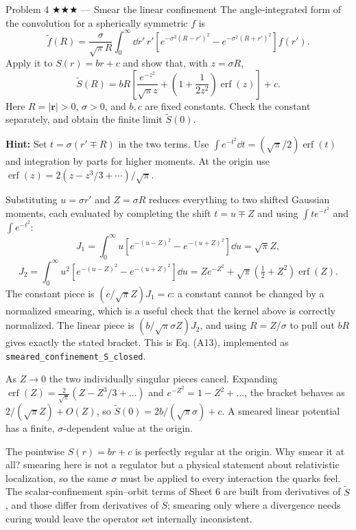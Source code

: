 \documentclass[11pt]{article}
\begin{document}
\begin{problem}{Problem 4 ★★★ — Smear the linear confinement}
The angle-integrated form of the convolution for a spherically symmetric $f$ is
\[
\widetilde f(R)=\frac{\sigma}{\sqrt\pi R}\int_0^\infty\dd r'\,r'
\left[e^{-\sigma^2(R-r')^2}-e^{-\sigma^2(R+r')^2}\right]f(r').
\]
Apply it to $S(r)=br+c$ and show that, with $z=\sigma R$,
\[
\widetilde S(R)=bR\left[\frac{e^{-z^2}}{\sqrt\pi z}
+\left(1+\frac1{2z^2}\right)\operatorname{erf}(z)\right]+c .
\]
Here $R=|\bm r|>0$, $\sigma>0$, and $b,c$ are fixed constants.
Check the constant separately, and obtain the finite limit $\widetilde S(0)$.

\textbf{Hint:} Set $t=\sigma(r'\mp R)$ in the two terms. Use
$\int e^{-t^2}\dd t=(\sqrt\pi/2)\operatorname{erf}(t)$ and integration
by parts for higher moments. At the origin use
$\operatorname{erf}(z)=2(z-z^3/3+\cdots)/\sqrt\pi$.
\end{problem}
\begin{solution}
Substituting $u=\sigma r'$ and $Z=\sigma R$ reduces everything to two shifted
Gaussian moments, each evaluated by completing the shift $t=u\mp Z$ and using
$\int t e^{-t^2}$ and $\int e^{-t^2}$:
\[
J_1=\int_0^\infty\! u\left[e^{-(u-Z)^2}-e^{-(u+Z)^2}\right]\dd u=\sqrt\pi Z,
\]
\[
J_2=\int_0^\infty\! u^2\left[e^{-(u-Z)^2}-e^{-(u+Z)^2}\right]\dd u
=Ze^{-Z^2}+\sqrt\pi\left(\tfrac12+Z^2\right)\operatorname{erf}(Z).
\]
The constant piece is $(c/\sqrt\pi Z)J_1=c$: a constant cannot be changed by a
normalized smearing, which is a useful check that the kernel above is correctly
normalized. The linear piece is $(b/\sqrt\pi\sigma Z)J_2$, and using
$R=Z/\sigma$ to pull out $bR$ gives exactly the stated bracket. This is
Eq. (A13), implemented as
\texttt{smeared\_confinement\_S\_closed}.

As $Z\to0$ the two individually singular pieces cancel. Expanding
$\operatorname{erf}(Z)=\tfrac{2}{\sqrt\pi}(Z-Z^3/3+\dots)$ and
$e^{-Z^2}=1-Z^2+\dots$, the bracket behaves as $2/(\sqrt\pi Z)+O(Z)$, so
$\widetilde S(0)=2b/(\sqrt\pi\sigma)+c$. A smeared linear potential has a
finite, $\sigma$-dependent value at the origin.
\end{solution}
\begin{quiz}
The pointwise $S(r)=br+c$ is perfectly regular at the origin. Why smear it at
all? \answer smearing here is not a regulator but a physical statement about
relativistic localization, so the same $\sigma$ must be applied to every
interaction the quarks feel. The scalar-confinement spin--orbit terms of
Sheet 6 are built from derivatives of $\widetilde S$, and those differ from
derivatives of $S$; smearing only where a divergence needs curing would leave
the operator set internally inconsistent.
\end{quiz}
\end{document}
